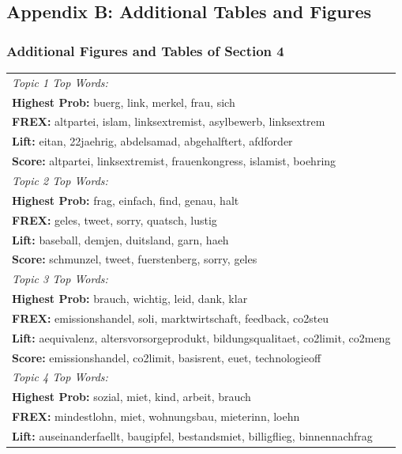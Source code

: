 \subsection*{Appendix B: Additional Tables and Figures}

\subsubsection*{Additional Figures and Tables of Section 4}

\begin{center}
\begin{longtable}{|l|}
\captionsetup{justification=centering,margin=2cm}
\endlastfoot
\hline
\textit{Topic 1 Top Words:}\\
 	 \textbf{Highest Prob:} buerg, link, merkel, frau, sich \\
 	 \textbf{FREX:} altpartei, islam, linksextremist, asylbewerb, linksextrem \\
 	 \textbf{Lift:} eitan, 22jaehrig, abdelsamad, abgehalftert, afdforder \\
 	 \textbf{Score:} altpartei, linksextremist, frauenkongress, islamist, boehring \\
\hline
\textit{Topic 2 Top Words:}\\
 	 \textbf{Highest Prob:} frag, einfach, find, genau, halt \\
 	 \textbf{FREX:} geles, tweet, sorry, quatsch, lustig \\
 	 \textbf{Lift:} baseball, demjen, duitsland, garn, haeh \\
 	 \textbf{Score:} schmunzel, tweet, fuerstenberg, sorry, geles \\
\hline
\textit{Topic 3 Top Words:}\\
 	 \textbf{Highest Prob:} brauch, wichtig, leid, dank, klar \\
 	 \textbf{FREX:} emissionshandel, soli, marktwirtschaft, feedback, co2steu \\
 	 \textbf{Lift:} aequivalenz, altersvorsorgeprodukt, bildungsqualitaet, co2limit, co2meng \\
 	 \textbf{Score:} emissionshandel, co2limit, basisrent, euet, technologieoff \\
\hline
\textit{Topic 4 Top Words:}\\
 	 \textbf{Highest Prob:} sozial, miet, kind, arbeit, brauch \\
 	 \textbf{FREX:} mindestlohn, miet, wohnungsbau, mieterinn, loehn \\
 	 \textbf{Lift:} auseinanderfaellt, baugipfel, bestandsmiet, billigflieg, binnennachfrag \\

\end{longtable}
\end{center}
